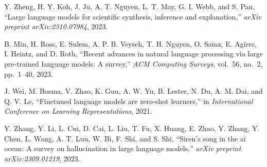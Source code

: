 \begin{enumerate}[leftmargin=2em,label={[\arabic*]}]
\item Y. Zheng, H. Y. Koh, J. Ju, A. T. Nguyen, L. T. May, G. I. Webb, and S. Pan, ``Large language models for scientific synthesis, inference and explanation,'' \textit{arXiv preprint arXiv:2310.07984}, 2023.

\item B. Min, H. Ross, E. Sulem, A. P. B. Veyseh, T. H. Nguyen, O. Sainz, E. Agirre, I. Heintz, and D. Roth, ``Recent advances in natural language processing via large pre-trained language models: A survey,'' \textit{ACM Computing Surveys}, vol.~56, no.~2, pp.~1--40, 2023.

\item J. Wei, M. Bosma, V. Zhao, K. Guu, A. W. Yu, B. Lester, N. Du, A. M. Dai, and Q. V. Le, ``Finetuned language models are zero-shot learners,'' in \textit{International Conference on Learning Representations}, 2021.

\item Y. Zhang, Y. Li, L. Cui, D. Cai, L. Liu, T. Fu, X. Huang, E. Zhao, Y. Zhang, Y. Chen, L. Wang, A. T. Luu, W. Bi, F. Shi, and S. Shi, ``Siren's song in the ai ocean: A survey on hallucination in large language models,'' \textit{arXiv preprint arXiv:2309.01219}, 2023.

\end{enumerate}


